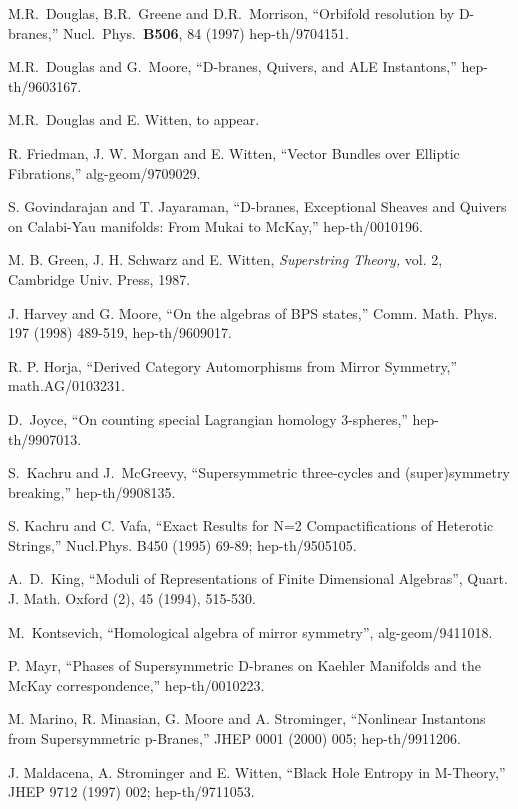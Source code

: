 \documentclass[a4paper,12pt]{amsart}
\numberwithin{equation}{section}
\theoremstyle{plain}
\theoremstyle{definition}
\begin{document}
\begin{thebibliography}{10}
M.R.~Douglas, B.R.~Greene and D.R.~Morrison, ``Orbifold
resolution by D-branes,'' Nucl.\ Phys.\ {\bf B506}, 84 (1997)
hep-th/9704151.

M.R.~Douglas and G.~Moore, ``D-branes, Quivers, and ALE Instantons,''
hep-th/9603167.

M.R.~Douglas and E. Witten, to appear.

R. Friedman, J. W. Morgan and E. Witten,
``Vector Bundles over Elliptic Fibrations,''
alg-geom/9709029.

S. Govindarajan and T. Jayaraman,  
``D-branes, Exceptional Sheaves and Quivers on 
Calabi-Yau manifolds: From Mukai to McKay,'' hep-th/0010196.

M. B. Green, J. H. Schwarz and E. Witten,
{\it Superstring Theory,} vol. 2, Cambridge Univ. Press, 1987.

J. Harvey and G. Moore, ``On the algebras of BPS states,''
Comm. Math. Phys. 197 (1998) 489-519, hep-th/9609017.

R. P. Horja,
``Derived Category Automorphisms from Mirror Symmetry,''
math.AG/0103231.

D.~Joyce, ``On counting special Lagrangian homology
3-spheres,'' hep-th/9907013.

S.~Kachru and J.~McGreevy, ``Supersymmetric three-cycles
and (super)symmetry breaking,'' hep-th/9908135.

S. Kachru and C. Vafa,
``Exact Results for N=2 Compactifications of Heterotic Strings,''
Nucl.Phys. B450 (1995) 69-89; hep-th/9505105.

A.~D.~King, ``Moduli of Representations of Finite Dimensional
Algebras'', Quart. J. Math. Oxford (2), 45 (1994), 515-530.

M.~Kontsevich, ``Homological algebra of mirror 
  symmetry'', alg-geom/9411018.

P. Mayr, ``Phases of Supersymmetric D-branes on 
Kaehler Manifolds and the McKay correspondence,'' hep-th/0010223.

M. Marino, R. Minasian, G. Moore and A. Strominger,
``Nonlinear Instantons from Supersymmetric p-Branes,''
JHEP 0001 (2000) 005; hep-th/9911206.

J. Maldacena, A. Strominger and E. Witten,
``Black Hole Entropy in M-Theory,''
JHEP 9712 (1997) 002; hep-th/9711053.


\end{thebibliography}
\end{document}
